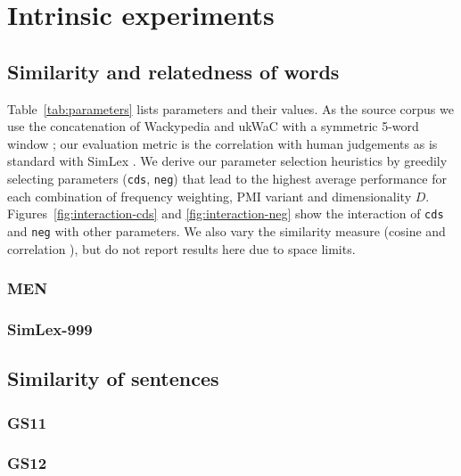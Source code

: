 
\chapter{Intrinsic experiments}
\label{cha:experiments}



\section{Similarity and relatedness of words}
\label{sec:lexical}

Table~\ref{tab:parameters} lists parameters and their values. As the source corpus we use the concatenation of Wackypedia and ukWaC \cite{ukwac} with a symmetric 5-word window \cite{milajevs-EtAl:2014:EMNLP2014}; our evaluation metric is the correlation with human judgements as is standard with SimLex \cite{hill2014simlex}. We derive our parameter selection heuristics by greedily selecting parameters (\texttt{cds}, \texttt{neg}) that lead to the highest average performance for each combination of frequency weighting, PMI variant and dimensionality $D$. Figures~\ref{fig:interaction-cds} and \ref{fig:interaction-neg} show the interaction of \texttt{cds} and \texttt{neg} with other parameters. We also vary the similarity measure (cosine and correlation  \cite{kiela-clark:2014:CVSC}), but do not report results here due to space limits.



\subsection{MEN}
\label{sec:men}

\subsection{SimLex-999}
\label{sec:simlex-999}

\section{Similarity of sentences}
\label{sec:sentential}

\subsection{GS11}
\label{sec:gs11}

\subsection{GS12}
\label{sec:gs12}

